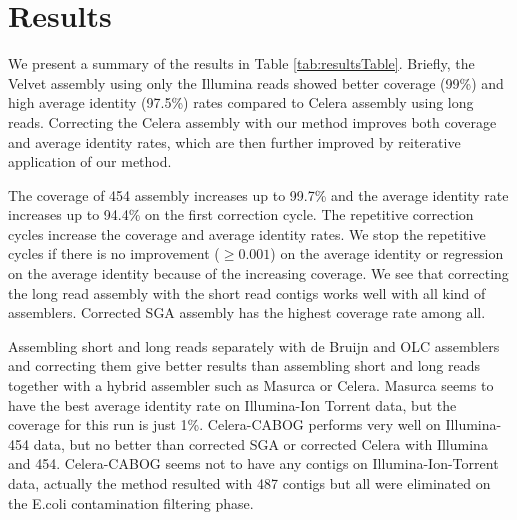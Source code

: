 \documentclass[12pt,a4paper]{cibb}
\begin{document}
\section{\bf Results}
\label{res}
We present a summary of the results in Table \ref{tab:resultsTable}. Briefly, the Velvet assembly using only the Illumina reads showed better coverage (99\%) and high average identity  (97.5\%) rates compared to Celera assembly using long reads. Correcting the Celera assembly with our method improves both coverage and average identity rates, which are then further improved by reiterative application of our method. 

The coverage of 454 assembly increases up to 99.7\% and the average identity rate increases up to 94.4\% on the first correction cycle. The repetitive correction cycles increase the coverage and average identity rates. We stop the repetitive cycles if there is no improvement ($\geq 0.001$) on the average identity or regression on the average identity because of the increasing coverage. We see that correcting the long read assembly with the short read contigs works well with all kind of assemblers. Corrected SGA assembly has the highest coverage rate among all.

Assembling short and long reads separately with de Bruijn and OLC assemblers and correcting them give better results than assembling short and long reads together with a hybrid assembler such as Masurca or Celera. Masurca seems to have the best average identity rate on Illumina-Ion Torrent data, but the coverage for this run is just 1\%. Celera-CABOG performs very well on Illumina-454 data, but no better than corrected SGA or corrected Celera with Illumina and 454. Celera-CABOG seems not to have any contigs on Illumina-Ion-Torrent data, actually the method resulted with 487 contigs but all were eliminated on the E.coli contamination filtering phase.
\end{document}
